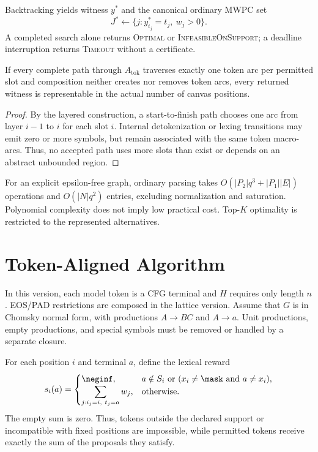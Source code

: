 Backtracking yields witness $y^*$ and the canonical ordinary MWPC set
\[
J^*\gets\{j:y^*_{i_j}=t_j,\ w_j>0\}.
\]
A completed search alone returns \textsc{Optimal} or \textsc{InfeasibleOnSupport}; a deadline interruption returns \textsc{Timeout} without a certificate.

\begin{theorem}
If every complete path through $A_{\mathrm{tok}}$ traverses exactly one token arc per permitted slot and composition neither creates nor removes token arcs, every returned witness is representable in the actual number of canvas positions.
\end{theorem}

\begin{proof}
By the layered construction, a start-to-finish path chooses one arc from layer $i-1$ to $i$ for each slot $i$. Internal detokenization or lexing transitions may emit zero or more symbols, but remain associated with the same token macro-arcs. Thus, no accepted path uses more slots than exist or depends on an abstract unbounded region.
\end{proof}

For an explicit epsilon-free graph, ordinary parsing takes $O(|P_2|q^3+|P_1||E|)$ operations and $O(|N|q^2)$ entries, excluding normalization and saturation. Polynomial complexity does not imply low practical cost. Top-$K$ optimality is restricted to the represented alternatives.


\section{Token-Aligned Algorithm}
\label{sec:tokenaligned}

In this version, each model token is a CFG terminal and $H$ requires only length $n$. EOS/PAD restrictions are composed in the lattice version. Assume that $G$ is in Chomsky normal form, with productions $A\rightarrow BC$ and $A\rightarrow a$. Unit productions, empty productions, and special symbols must be removed or handled by a separate closure.

For each position $i$ and terminal $a$, define the lexical reward
\begin{equation}
s_i(a)=
\begin{cases}
\neginf, & a\notin S_i\text{ or }(x_i\neq\mask\text{ and }a\neq x_i),\\
\displaystyle\sum_{j:i_j=i,\ t_j=a}w_j, & \text{otherwise.}
\end{cases}
\label{eq:lexscore}
\end{equation}
The empty sum is zero. Thus, tokens outside the declared support or incompatible with fixed positions are impossible, while permitted tokens receive exactly the sum of the proposals they satisfy.

